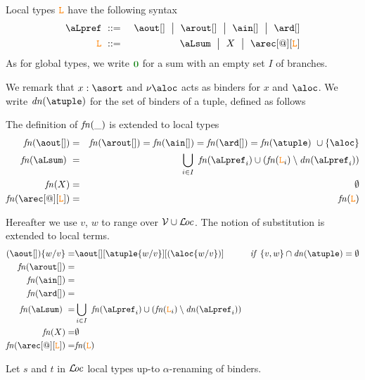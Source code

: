 %

Local types $\texttt{\textcolor{orange}L}$ have the following syntax
\begin{eqnarray*}
  \aLpref & \bnfdef &
                  \aout[] \bnfmid
                  \arout[]\bnfmid
                  \ain[] \bnfmid
                  \ard[] 
\\
  \aL & \bnfdef &
                  \aLsum \bnfmid
                  X \bnfmid
                  \arec[@][\aL]
\end{eqnarray*}
As for global types, we write $\nil$ for a sum with an empty set $I$ of branches. 

We remark that  $x : \asort$ and $\nu \aloc$ acts as binders for $x$ and $\aloc$. 
We write $\dn\atuple$ for the set of binders of a tuple, defined as follows

The definition of ${\it fn}(\_)$ is extended to local types 
\begin{eqnarray*}
  \fn {\aout[]}  & = & \fn {\arout[]} = \fn {\ain[]} = \fn {\ard[]} = \fn {\atuple} \cup \{\aloc\}  
  \\
  \fn {\aLsum} & = & \bigcup_{i\in I} \fn{\aLpref_i}\cup (\fn {\aL_i}\setminus \dn{\aLpref_i}) 
  \\
  \fn {X} & = & \emptyset 
  \\
  \fn {\arec[@][\aL]} & = & \fn {\aL} 
\end{eqnarray*}

 
Hereafter we use $v$, $w$ to range over $\mathcal{V}\cup\mathcal{L}\!\mathit{oc}$. The notion of substitution is extended to local terms.
\begin{align*}
  (\aout[]) \sust v w  = &  \aout[][\atuple\sust v w][(\aloc\sust v w)] &  {\it if}\  \{v,w\}\cap \dn\atuple = \emptyset
  \\ 
  \fn {\arout[]} = & 
  \\
  \fn {\ain[]}  = &
  \\
  \fn {\ard[]}  = &
  \\
  \fn {\aLsum}  = & \bigcup_{i\in I} \fn{\aLpref_i}\cup (\fn {\aL_i}\setminus \dn{\aLpref_i}) 
  \\
  \fn {X}  = & \emptyset 
  \\
  \fn {\arec[@][\aL]}  = & \fn {\aL} 
\end{align*}


Let $s$ and $t$ in $\mathcal{L}\!\mathit{oc}$  local types up-to $\alpha$-renaming of binders. 

%
%

